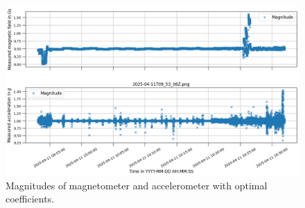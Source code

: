 \begin{figure}[H]
    \centering
    \includegraphics[width=\linewidth]{images/04_results/optimal_calibrated_11apr_magnitude.png}
    \caption{Magnitudes of magnetometer and accelerometer with optimal coefficients.}
    \label{fig:res:optimal_coeff_magnitude}
\end{figure}